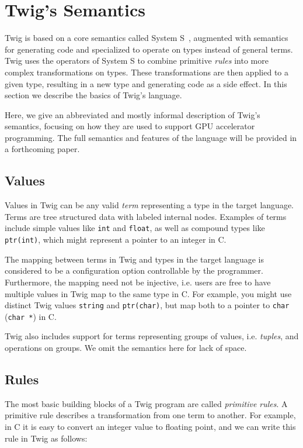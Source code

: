 
\section{Twig's Semantics}
\label{semantics}

Twig is based on a core semantics called System
S~\cite{Visser:1998p333}, augmented with semantics for generating code
and specialized to operate on types instead of general terms. Twig
uses the operators of System S to combine primitive \emph{rules} into
more complex transformations on types. These transformations are then
applied to a given type, resulting in a new type and generating code
as a side effect. In this section we describe the basics of Twig's
language.

Here, we give an abbreviated and mostly informal description of Twig's
semantics, focusing on how they are used to support GPU accelerator
programming.  The full semantics and features of the language will be
provided in a forthcoming paper.

\subsection{Values}

Values in Twig can be any valid \emph{term} representing a type in the
target language. Terms are tree structured data with labeled internal
nodes. Examples of terms include simple values like \texttt{int} and
\texttt{float}, as well as compound types like \texttt{ptr(int)},
which might represent a pointer to an integer in C.

The mapping between terms in Twig and types in the target language is
considered to be a configuration option controllable by the
programmer. Furthermore, the mapping need not be injective, i.e. users
are free to have multiple values in Twig map to the same type in
C. For example, you might use distinct Twig values \texttt{string} and
\texttt{ptr(char)}, but map both to a pointer to \texttt{char}
(\texttt{char *}) in C.

Twig also includes support for terms representing groups of values,
i.e.  \emph{tuples}, and operations on groups. We omit the semantics
here for lack of space.

\subsection{Rules}

The most basic building blocks of a Twig program are called
\emph{primitive rules}. A primitive rule describes a transformation
from one term to another.  For example, in C it is easy to convert an
integer value to floating point, and we can write this rule in Twig as
follows:

